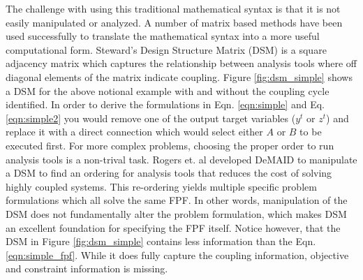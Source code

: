     The challenge with using this traditional mathematical syntax is that it is not easily manipulated or analyzed. 
    A number of matrix based methods have been used successfully to translate the mathematical syntax into a more useful computational form. 
    Steward's Design Structure Matrix (DSM) is a square adjacency matrix which captures the relationship between analysis tools where off 
    diagonal elements of the matrix indicate coupling\cite{Steward1981}. Figure \ref{fig:dsm_simple} shows a DSM for the above notional example 
    with and without the coupling cycle identified. In order to derive the formulations in Eqn. \ref{eqn:simple} and Eq. \ref{eqn:simple2} 
    you would remove one of the output target variables ($y^t$ or $z^t$) and replace it with a direct connection which would select either $A$
    or $B$ to be executed first. For more complex problems, choosing the proper order to run analysis tools is a non-trival task. 
    Rogers et. al developed DeMAID to manipulate a DSM to find an ordering for analysis tools that 
    reduces the cost of solving highly coupled systems\cite{Rogers1996}. This re-ordering yields multiple specific problem 
    formulations which all solve the same FPF. In other words, manipulation of the DSM does not fundamentally alter
    the problem formulation, which makes DSM an excellent foundation for specifying the FPF itself. Notice however, that the DSM in 
    Figure \ref{fig:dsm_simple} contains less information than the Eqn. \ref{eqn:simple_fpf}. While it does fully capture 
    the coupling information, objective and constraint information is missing.
    
